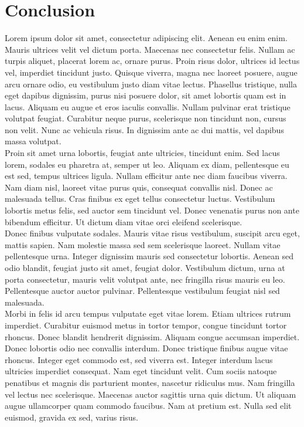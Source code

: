 \chapter{Conclusion}
\label{chap:III-3-conclusion}

Lorem ipsum dolor sit amet, consectetur adipiscing elit. Aenean eu enim enim. Mauris ultrices velit vel dictum porta. Maecenas nec consectetur felis. Nullam ac turpis aliquet, placerat lorem ac, ornare purus. Proin risus dolor, ultrices id lectus vel, imperdiet tincidunt justo. Quisque viverra, magna nec laoreet posuere, augue arcu ornare odio, eu vestibulum justo diam vitae lectus. Phasellus tristique, nulla eget dapibus dignissim, purus nisi posuere dolor, sit amet lobortis quam est in lacus. Aliquam eu augue et eros iaculis convallis. Nullam pulvinar erat tristique volutpat feugiat. Curabitur neque purus, scelerisque non tincidunt non, cursus non velit. Nunc ac vehicula risus. In dignissim ante ac dui mattis, vel dapibus massa volutpat. \\

Proin sit amet urna lobortis, feugiat ante ultricies, tincidunt enim. Sed lacus lorem, sodales eu pharetra at, semper ut leo. Aliquam ex diam, pellentesque eu est sed, tempus ultrices ligula. Nullam efficitur ante nec diam faucibus viverra. Nam diam nisl, laoreet vitae purus quis, consequat convallis nisl. Donec ac malesuada tellus. Cras finibus ex eget tellus consectetur luctus. Vestibulum lobortis metus felis, sed auctor sem tincidunt vel. Donec venenatis purus non ante bibendum efficitur. Ut dictum diam vitae orci eleifend scelerisque. \\

Donec finibus vulputate sodales. Mauris vitae risus vestibulum, suscipit arcu eget, mattis sapien. Nam molestie massa sed sem scelerisque laoreet. Nullam vitae pellentesque urna. Integer dignissim mauris sed consectetur lobortis. Aenean sed odio blandit, feugiat justo sit amet, feugiat dolor. Vestibulum dictum, urna at porta consectetur, mauris velit volutpat ante, nec fringilla risus mauris eu leo. Pellentesque auctor auctor pulvinar. Pellentesque vestibulum feugiat nisl sed malesuada. \\

Morbi in felis id arcu tempus vulputate eget vitae lorem. Etiam ultrices rutrum imperdiet. Curabitur euismod metus in tortor tempor, congue tincidunt tortor rhoncus. Donec blandit hendrerit dignissim. Aliquam congue accumsan imperdiet. Donec lobortis odio nec convallis interdum. Donec tristique finibus augue vitae rhoncus. Integer eget commodo est, sed viverra est. Integer interdum lacus ultricies imperdiet consequat. Nam eget tincidunt velit. Cum sociis natoque penatibus et magnis dis parturient montes, nascetur ridiculus mus. Nam fringilla vel lectus nec scelerisque. Maecenas auctor sagittis urna quis dictum. Ut aliquam augue ullamcorper quam commodo faucibus. Nam at pretium est. Nulla sed elit euismod, gravida ex sed, varius risus. \\

